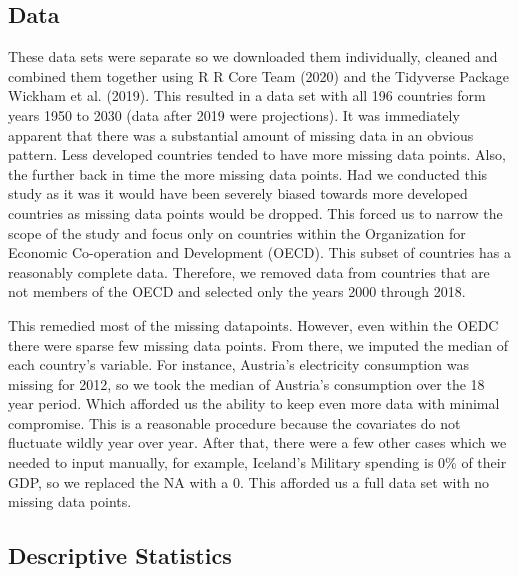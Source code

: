 \documentclass[
  english,
  man,floatsintext]{apa6}
\begin{document}
\hypertarget{data}{%
\subsection{Data}\label{data}}

These data sets were separate so we downloaded them individually, cleaned and combined them together using R R Core Team (2020) and the Tidyverse Package Wickham et al. (2019). This resulted in a data set with all 196 countries form years 1950 to 2030 (data after 2019 were projections). It was immediately apparent that there was a substantial amount of missing data in an obvious pattern. Less developed countries tended to have more missing data points. Also, the further back in time the more missing data points. Had we conducted this study as it was it would have been severely biased towards more developed countries as missing data points would be dropped. This forced us to narrow the scope of the study and focus only on countries within the Organization for Economic Co-operation and Development (OECD). This subset of countries has a reasonably complete data. Therefore, we removed data from countries that are not members of the OECD and selected only the years 2000 through 2018.

This remedied most of the missing datapoints. However, even within the OEDC there were sparse few missing data points. From there, we imputed the median of each country's variable. For instance, Austria's electricity consumption was missing for 2012, so we took the median of Austria's consumption over the 18 year period. Which afforded us the ability to keep even more data with minimal compromise. This is a reasonable procedure because the covariates do not fluctuate wildly year over year. After that, there were a few other cases which we needed to input manually, for example, Iceland's Military spending is 0\% of their GDP, so we replaced the NA with a 0. This afforded us a full data set with no missing data points.

\hypertarget{descriptive-statistics}{%
\subsection{Descriptive Statistics}\label{descriptive-statistics}}
\end{document}
